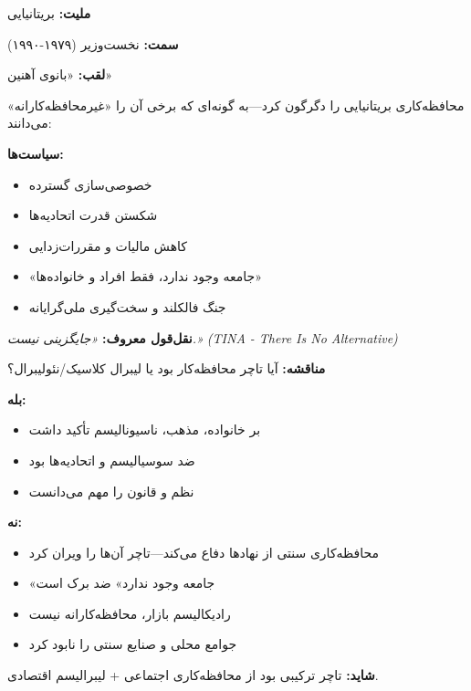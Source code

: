 \begin{personbox}

\textbf{ملیت:} بریتانیایی

\textbf{سمت:} نخست‌وزیر (۱۹۷۹-۱۹۹۰)

\textbf{لقب:} «بانوی آهنین»

\mediumspace

 محافظه‌کاری بریتانیایی را دگرگون کرد—به گونه‌ای که برخی آن را «غیرمحافظه‌کارانه» می‌دانند:

\textbf{سیاست‌ها:}
\begin{itemize}[nosep]
    \item خصوصی‌سازی گسترده
    \item شکستن قدرت اتحادیه‌ها
    \item کاهش مالیات و مقررات‌زدایی
    \item «جامعه وجود ندارد، فقط افراد و خانواده‌ها»
    \item جنگ فالکلند و سخت‌گیری ملی‌گرایانه
\end{itemize}

\mediumspace

\textbf{نقل‌قول معروف:} \textit{«جایگزینی نیست.» (TINA - There Is No Alternative)}

\mediumspace

\textbf{مناقشه:} آیا تاچر محافظه‌کار بود یا لیبرال کلاسیک/نئولیبرال؟
\end{personbox}

\begin{debatebox}
\textbf{بله:}
\begin{itemize}[nosep]
    \item بر خانواده، مذهب، ناسیونالیسم تأکید داشت
    \item ضد سوسیالیسم و اتحادیه‌ها بود
    \item نظم و قانون را مهم می‌دانست
\end{itemize}

\textbf{نه:}
\begin{itemize}[nosep]
    \item محافظه‌کاری سنتی از نهادها دفاع می‌کند—تاچر آن‌ها را ویران کرد
    \item «جامعه وجود ندارد» ضد برک است
    \item رادیکالیسم بازار، محافظه‌کارانه نیست
    \item جوامع محلی و صنایع سنتی را نابود کرد
\end{itemize}

\textbf{شاید:} تاچر ترکیبی بود از محافظه‌کاری اجتماعی + لیبرالیسم اقتصادی.
\end{debatebox}

